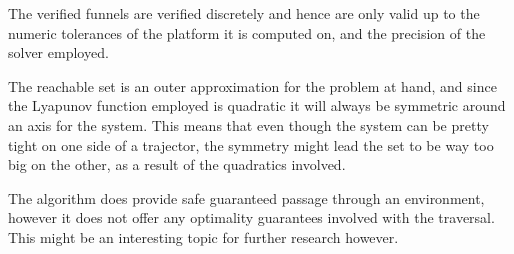 The verified funnels are verified discretely and hence are only valid up to the
numeric tolerances of the platform it is computed on, and the precision of the
solver employed.

The reachable set is an outer approximation for the problem at hand, and since
the Lyapunov function employed is quadratic it will always be symmetric around
an axis for the system. This means that even though the system can be pretty
tight on one side of a trajector, the symmetry might lead the set to be way too
big on the other, as a result of the quadratics involved.

The \rrtfunnel{} algorithm does provide safe guaranteed passage through an
environment, however it does not offer any optimality guarantees involved with
the traversal. This might be an interesting topic for further research however.